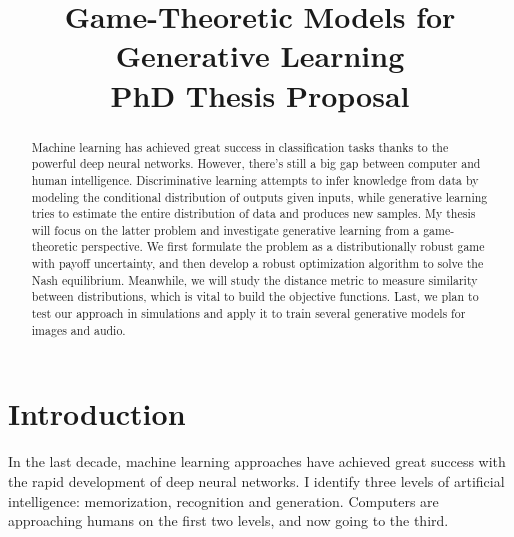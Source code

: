 \documentclass{article}
\title{Game-Theoretic Models for Generative Learning \\{\normalsize PhD Thesis Proposal}
}
\begin{document}

\maketitle

\begin{abstract}
Machine learning has achieved great success in classification tasks thanks to the powerful deep neural networks. However, there's still a big gap between computer and human intelligence.
Discriminative learning attempts to infer knowledge from data by modeling the conditional distribution of outputs given inputs, while generative learning tries to estimate the entire distribution of data and produces new samples.
My thesis will focus on the latter problem and investigate generative learning from a game-theoretic perspective. We first formulate the problem as a distributionally robust game with payoff uncertainty, and then develop a robust optimization algorithm to solve the Nash equilibrium.
Meanwhile, we will study the distance metric to measure similarity between distributions, which is vital to build the objective functions.
Last, we plan to test our approach in simulations and apply it to train several generative models for images and audio.

\end{abstract}



\section{Introduction}
\label{Sec:Intro}

In the last decade, machine learning approaches have achieved great success with the rapid development of deep neural networks.  I identify three levels of artificial intelligence: memorization, recognition and generation. Computers are approaching humans on the first two levels, and now going to the third.
\end{document}

